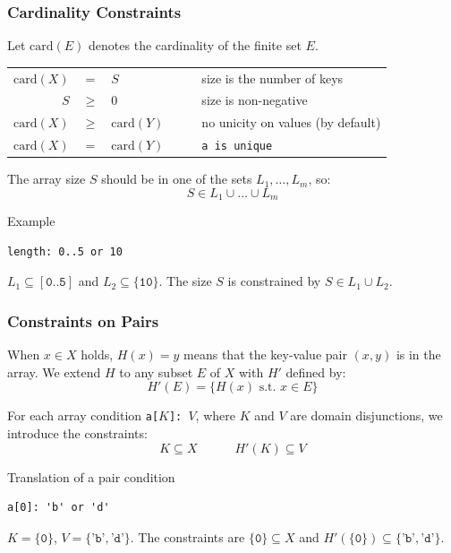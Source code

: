 \documentclass[9pt]{beamer}
\newcommand{\code}[1]{\texttt{#1}}
\begin{document}
\begin{frame}[fragile]
\frametitle{Cardinality Constraints}

{
\footnotesize
Let $\mathrm{card}(E)$ denotes the cardinality of the finite set $E$.
}


\begin{center}
\begin{tabular}{rcll}
$\mathrm{card}(X)$ &    =   & $S$                & $\quad\quad$size is the number of keys \\
$S$                &  $\ge$ & $0$                & $\quad\quad$size is non-negative \\
$\mathrm{card}(X)$ &  $\ge$ & $\mathrm{card}(Y)$ & $\quad\quad$no unicity on values (by default) \\
$\mathrm{card}(X)$ &    =   & $\mathrm{card}(Y)$ & $\quad\quad$\code{a is unique}
\end{tabular}
\end{center}

The array size $S$ should be in one of the sets $L_1, \dots, L_m$, so:
$$S \in L_1 \cup \dots \cup L_m$$

\begin{exampleblock}{Example}
\begin{verbatim}
length: 0..5 or 10
\end{verbatim}
$L_1 \subseteq [\code{0..5}]$ and $L_2 \subseteq \{\code{10}\}$. The size $S$ is
constrained by $S \in L_1 \cup L_2$.
\end{exampleblock}

\end{frame}

\begin{frame}[fragile]
\frametitle{Constraints on Pairs}

{
\footnotesize
When $x \in X$ holds, $H(x) = y$ means that the key-value pair $(x, y)$ is in
the array. We extend $H$ to any subset $E$ of $X$ with $H'$ defined by:
$$H'(E) = \{H(x) \text{ s.t. } x \in E\}$$
}

For each array condition \code{a[$K$]:~$V$}, where $K$ and $V$ are domain
disjunctions, we introduce the constraints:
$$K \subseteq X \quad\quad\quad H'(K) \subseteq V$$

\begin{exampleblock}{Translation of a pair condition}
\begin{verbatim}
a[0]: 'b' or 'd'
\end{verbatim}
$K = \{\code{0}\}$, $V = \{\code{'b'}, \code{'d'}\}$. The constraints are
$\{\code{0}\} \subseteq X$ and $H'(\{\code{0}\}) \subseteq \{\code{'b'},
\code{'d'}\}$.
\end{exampleblock}

\end{frame}
\end{document}
